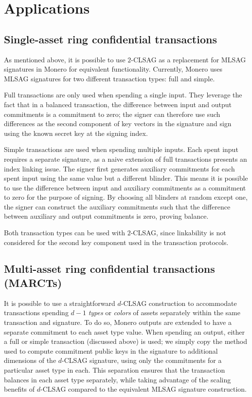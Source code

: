 \documentclass{mrl}
\theoremstyle{plain}
\theoremstyle{definition}
\begin{document}
\section{Applications}

\subsection{Single-asset ring confidential transactions}\label{sec:ringct}

As mentioned above, it is possible to use $2$-CLSAG as a replacement for MLSAG signatures in Monero for equivalent functionality. Currently, Monero uses MLSAG signatures for two different transaction types: full and simple.

Full transactions are only used when spending a single input. They leverage the fact that in a balanced transaction, the difference between input and output commitments is a commitment to zero; the signer can therefore use such differences as the second component of key vectors in the signature and sign using the known secret key at the signing index.

Simple transactions are used when spending multiple inputs. Each spent input requires a separate signature, as a naive extension of full transactions presents an index linking issue. The signer first generates auxiliary commitments for each spent input using the same value but a different blinder. This means it is possible to use the difference between input and auxiliary commitments as a commitment to zero for the purpose of signing. By choosing all blinders at random except one, the signer can construct the auxiliary commitments such that the difference between auxiliary and output commitments is zero, proving balance.

Both transaction types can be used with $2$-CLSAG, since linkability is not considered for the second key component used in the transaction protocols.


\subsection{Multi-asset ring confidential transactions (MARCTs)}

It is possible to use a straightforward $d$-CLSAG construction to accommodate transactions spending $d-1$ \textit{types} or \textit{colors} of assets separately within the same transaction and signature. To do so, Monero outputs are extended to have a separate commitment to each asset type value. When spending an output, either a full or simple transaction (discussed above) is used; we simply copy the method used to compute commitment public keys in the signature to additional dimensions of the $d$-CLSAG signature, using only the commitments for a particular asset type in each. This separation ensures that the transaction balances in each asset type separately, while taking advantage of the scaling benefits of $d$-CLSAG compared to the equivalent MLSAG signature construction.
\end{document}

